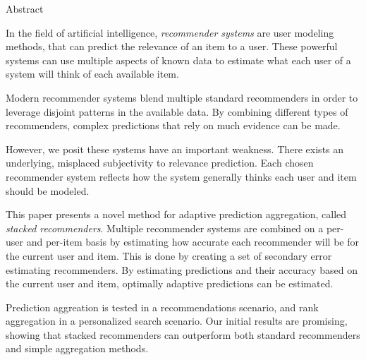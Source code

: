 \null\vspace{4em}
{
  \centering
  \normalfont
  \huge
  Abstract\\
}
\vspace{2em}

\noindent
In the field of artificial intelligence,
\emph{recommender systems} are user modeling methods,
that can predict the relevance of an item to a user.
These powerful systems can use multiple aspects of known data
to estimate what each user of a system will think of each available item.

Modern recommender systems blend multiple standard recommenders
in order to leverage disjoint patterns in the available data.
By combining different types of recommenders,
complex predictions that rely on much evidence can be made.

However, we posit these systems have an important weakness.
There exists an underlying, misplaced subjectivity to relevance prediction.
Each chosen recommender system reflects how the system
generally thinks each user and item should be modeled.

This paper presents a novel method for adaptive prediction aggregation,
called \emph{stacked recommenders}.
Multiple recommender systems are combined on a per-user and per-item basis
by estimating how accurate each recommender will be for the current user and item.
This is done by creating a set of secondary error estimating recommenders.
By estimating predictions and their accuracy based 
on the current user and item,
optimally adaptive predictions can be estimated.

Prediction aggreation is tested in a recommendations scenario,
and rank aggregation in a personalized search scenario.
Our initial results are promising, showing that stacked recommenders
can outperform both standard recommenders and simple aggregation methods.

\clearpage
